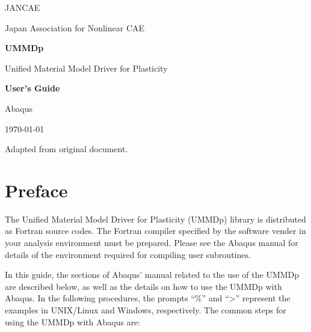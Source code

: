 \documentclass[11pt,a4paper,twoside,final,onecolumn,titlepage]{article}
\begin{document}
\begin{titlepage}
\LARGE JANCAE

\large Japan Association for Nonlinear CAE

\vspace*{150pt}
\Huge \textbf{UMMDp}

\vspace*{10pt}
\LARGE Unified Material Model Driver for Plasticity

\vspace*{50pt}
\begin{flushright}
\Huge \textbf{User's Guide}

\LARGE Abaqus
\end{flushright}

\vspace*{50pt}
\begin{center}

\vspace*{180pt}
\large \today

\large Adapted from original document.

\end{center}
\end{titlepage}

\tableofcontents

\newpage
\section{Preface}
\vspace{0.5cm}

The Unified Material Model Driver for Plasticity (UMMDp) library is distributed as Fortran source codes. The Fortran compiler specified by the software vender in your analysis environment must be prepared. Please see the Abaqus manual for details of the environment required for compiling user subroutines. 

In this guide, the sections of Abaqus' manual related to the use of the UMMDp are described below, as well as the details on how to use the UMMDp with Abaqus. In the following procedures, the prompts “\%” and “\textgreater” represent the examples in UNIX/Linux and Windows, respectively. The common steps for using the UMMDp with Abaqus are:
\end{document}
